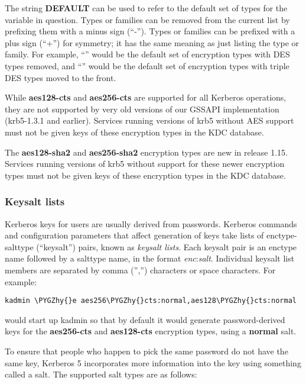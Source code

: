 \documentclass[letterpaper,10pt,english]{sphinxmanual}
\def\PYGZhy{\char`\-}
\begin{document}
The string \textbf{DEFAULT} can be used to refer to the default set of
types for the variable in question.  Types or families can be removed
from the current list by prefixing them with a minus sign (``-'').
Types or families can be prefixed with a plus sign (``+'') for symmetry;
it has the same meaning as just listing the type or family.  For
example, ``'' would be the default set of encryption
types with DES types removed, and ``'' would be the
default set of encryption types with triple DES types moved to the
front.

While \textbf{aes128-cts} and \textbf{aes256-cts} are supported for all Kerberos
operations, they are not supported by very old versions of our GSSAPI
implementation (krb5-1.3.1 and earlier).  Services running versions of
krb5 without AES support must not be given keys of these encryption
types in the KDC database.

The \textbf{aes128-sha2} and \textbf{aes256-sha2} encryption types are new in
release 1.15.  Services running versions of krb5 without support for
these newer encryption types must not be given keys of these
encryption types in the KDC database.


\subsubsection{Keysalt lists}
\label{admin/conf_files/kdc_conf:id7}\label{admin/conf_files/kdc_conf:keysalt-lists}
Kerberos keys for users are usually derived from passwords.  Kerberos
commands and configuration parameters that affect generation of keys
take lists of enctype-salttype (``keysalt'') pairs, known as \emph{keysalt
lists}.  Each keysalt pair is an enctype name followed by a salttype
name, in the format \emph{enc}:\emph{salt}.  Individual keysalt list members are
separated by comma ('','') characters or space characters.  For example:

\begin{Verbatim}[commandchars=\\\{\}]
kadmin \PYGZhy{}e aes256\PYGZhy{}cts:normal,aes128\PYGZhy{}cts:normal
\end{Verbatim}

would start up kadmin so that by default it would generate
password-derived keys for the \textbf{aes256-cts} and \textbf{aes128-cts}
encryption types, using a \textbf{normal} salt.

To ensure that people who happen to pick the same password do not have
the same key, Kerberos 5 incorporates more information into the key
using something called a salt.  The supported salt types are as
follows:
\end{document}
